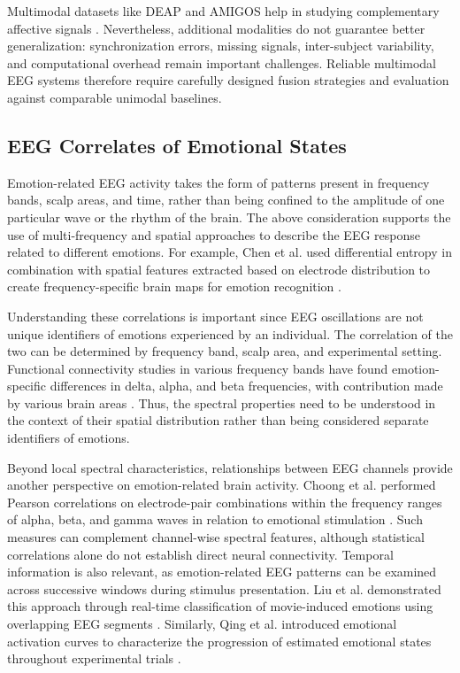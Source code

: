 \documentclass[ASNA,twocolumn]{USG}
\begin{document}
Multimodal datasets like DEAP and AMIGOS help in studying complementary affective signals \cite{soleymani2017survey,miranda2018amigos}. Nevertheless, additional modalities do not guarantee better generalization: synchronization errors, missing signals, inter-subject variability, and computational overhead remain important challenges. Reliable multimodal EEG systems therefore require carefully designed fusion strategies and evaluation against comparable unimodal baselines.


\subsection{EEG Correlates of Emotional States}
Emotion-related EEG activity takes the form of patterns present in frequency bands, scalp areas, and time, rather than being confined to the amplitude of one particular wave or the rhythm of the brain. The above consideration supports the use of multi-frequency and spatial approaches to describe the EEG response related to different emotions. For example, Chen et al. used differential entropy in combination with spatial features extracted based on electrode distribution to create frequency-specific brain maps for emotion recognition \cite{chen2025eeg}.

Understanding these correlations is important since EEG oscillations are not unique identifiers of emotions experienced by an individual. The correlation of the two can be determined by frequency band, scalp area, and experimental setting. Functional connectivity studies in various frequency bands have found emotion-specific differences in delta, alpha, and beta frequencies, with contribution made by various brain areas \cite{zhang2023eeg}. Thus, the spectral properties need to be understood in the context of their spatial distribution rather than being considered separate identifiers of emotions.

Beyond local spectral characteristics, relationships between EEG channels provide another perspective on emotion-related brain activity. Choong et al. performed Pearson correlations on electrode-pair combinations within the frequency ranges of alpha, beta, and gamma waves in relation to emotional stimulation \cite{choong2021correlation}. Such measures can complement channel-wise spectral features, although statistical correlations alone do not establish direct neural connectivity. Temporal information is also relevant, as emotion-related EEG patterns can be examined across successive windows during stimulus presentation. Liu et al. demonstrated this approach through real-time classification of movie-induced emotions using overlapping EEG segments \cite{liu2017real}. Similarly, Qing et al. introduced emotional activation curves to characterize the progression of estimated emotional states throughout experimental trials \cite{qing2019interpretable}.
\end{document}
